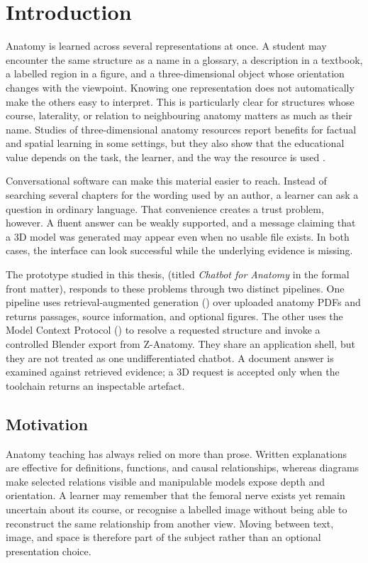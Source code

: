 \chapter{Introduction}
\label{chap:introduction}

Anatomy is learned across several representations at once. A student may encounter the same structure as a name in a glossary, a description in a textbook, a labelled region in a figure, and a three-dimensional object whose orientation changes with the viewpoint. Knowing one representation does not automatically make the others easy to interpret. This is particularly clear for structures whose course, laterality, or relation to neighbouring anatomy matters as much as their name. Studies of three-dimensional anatomy resources report benefits for factual and spatial learning in some settings, but they also show that the educational value depends on the task, the learner, and the way the resource is used \parencite{yammine2015,moro2017}.

Conversational software can make this material easier to reach. Instead of searching several chapters for the wording used by an author, a learner can ask a question in ordinary language. That convenience creates a trust problem, however. A fluent answer can be weakly supported, and a message claiming that a 3D model was generated may appear even when no usable file exists. In both cases, the interface can look successful while the underlying evidence is missing.

The prototype studied in this thesis, \systemname{} (titled \emph{Chatbot for Anatomy} in the formal front matter), responds to these problems through two distinct pipelines. One pipeline uses retrieval-augmented generation (\RAG{}) over uploaded anatomy PDFs and returns passages, source information, and optional figures. The other uses the Model Context Protocol (\MCP{}) to resolve a requested structure and invoke a controlled Blender export from Z-Anatomy. They share an application shell, but they are not treated as one undifferentiated chatbot. A document answer is examined against retrieved evidence; a 3D request is accepted only when the toolchain returns an inspectable artefact.

\section{Motivation}
\label{sec:introduction-motivation}

Anatomy teaching has always relied on more than prose. Written explanations are effective for definitions, functions, and causal relationships, whereas diagrams make selected relations visible and manipulable models expose depth and orientation. A learner may remember that the femoral nerve exists yet remain uncertain about its course, or recognise a labelled image without being able to reconstruct the same relationship from another view. Moving between text, image, and space is therefore part of the subject rather than an optional presentation choice.

